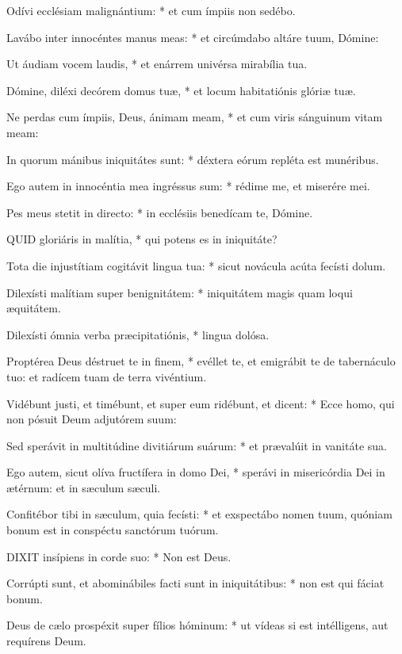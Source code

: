 Odívi ecclésiam malignántium: * et cum ímpiis non sedébo.

Lavábo inter innocéntes manus meas: * et circúmdabo altáre tuum, Dómine:

Ut áudiam vocem laudis, * et enárrem univérsa mirabília tua.

Dómine, diléxi decórem domus tuæ, * et locum habitatiónis glóriæ tuæ.

Ne perdas cum ímpiis, Deus, ánimam meam, * et cum viris sánguinum vitam meam:

In quorum mánibus iniquitátes sunt: * déxtera eórum repléta est munéribus.

Ego autem in innocéntia mea ingréssus sum: * rédime me, et miserére mei.

Pes meus stetit in directo: * in ecclésiis benedícam te, Dómine.


\lettrine[lines=2]{Q}{UID} gloriáris in malítia, * qui potens es in iniquitáte?

Tota die injustítiam cogitávit lingua tua: * sicut novácula acúta fecísti dolum.

Dilexísti malítiam super benignitátem: * iniquitátem magis quam loqui æquitátem.

Dilexísti ómnia verba præcipitatiónis, * lingua dolósa.

Proptérea Deus déstruet te in finem, * evéllet te, et emigrábit te de tabernáculo tuo: et radícem tuam de terra vivéntium.

Vidébunt justi, et timébunt, et super eum ridébunt, et dicent: * Ecce homo, qui non pósuit Deum adjutórem suum:

Sed sperávit in multitúdine divitiárum suárum: * et prævalúit in vanitáte sua.

Ego autem, sicut olíva fructífera in domo Dei, * sperávi in misericórdia Dei in ætérnum: et in sæculum sæculi.

Confitébor tibi in sæculum, quia fecísti: * et exspectábo nomen tuum, quóniam bonum est in conspéctu sanctórum tuórum.


\lettrine[lines=2]{D}{IXIT} insípiens in corde suo: * Non est Deus.

Corrúpti sunt, et abominábiles facti sunt in iniquitátibus: * non est qui fáciat bonum.

Deus de cælo prospéxit super fílios hóminum: * ut vídeas si est intélligens, aut requírens Deum.

